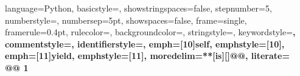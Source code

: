 \setcounter{exercise}{1}

\newcommand{\Exercise}{\theexercise . Excercise \addtocounter{exercise}{1}}

\setcounter{interlude}{1}
\setcounter{preframe_interlude}{1}


\newcommand{\Interlude}[1]{Interlude -- #1}

\usepackage{marvosym}
\usepackage{multicol}

\usepackage{hhline}

\usepackage{times}

\newcommand\Fontvi{\fontsize{6}{7.2}\selectfont}
% 
\usepackage{dirtree,float} %
\usepackage[nodisplayskipstretch]{setspace}


\usepackage{verbatim}
\usepackage{listings}

\newcommand{\altverb}[2][{}]{\colorbox{plightgrey}{\lstinline[language={#1}]{#2}}}


\lstset{showspaces=false,
basicstyle=\small,
showstringspaces=false}


{
  language=Python,
  basicstyle=\small,
  showstringspaces=false,
  stepnumber=5,
  numberstyle=\tiny,
  numbersep=5pt,
  showspaces=false,
  frame=single,
  framerule=0.4pt,
  rulecolor=\color{pgrey},
  backgroundcolor=\color{white},
  stringstyle=\color{BrickRed},
  keywordstyle=\color{BlueViolet}\bfseries,
  commentstyle=\color{PineGreen}\bfseries,
  identifierstyle={},
  emph={[10]self}, emphstyle={[10]\color{pblue}},
  emph={[11]yield}, emphstyle={[11]\color{pblue}},
  moredelim=**[is][\bfseries\color{red}]{@}{@},
  literate={\\@}{{\makeatletter @ \makeatother}}1
}

